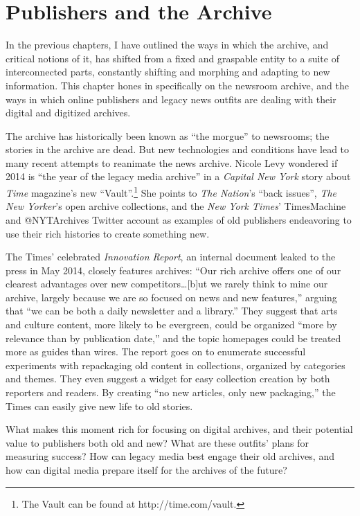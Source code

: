 \chapter{Publishers and the Archive}

In the previous chapters, I have outlined the ways in which the archive, and critical notions of it, has shifted from a fixed and graspable entity to a suite of interconnected parts, constantly shifting and morphing and adapting to new information. This chapter hones in specifically on the newsroom archive, and the ways in which online publishers and legacy news outfits are dealing with their digital and digitized archives.

The archive has historically been known as ``the morgue'' to newsrooms; the stories in the archive are dead. But new technologies and conditions have lead to many recent attempts to reanimate the news archive. Nicole Levy wondered if 2014 is ``the year of the legacy media archive'' in a \emph{Capital New York} story about \emph{Time} magazine's new ``Vault''.\footnote{The Vault can be found at http://time.com/vault.} She points to \emph{The Nation}'s ``back issues'', \emph{The New Yorker}'s open archive collections, and the \emph{New York Times}' TimesMachine and @NYTArchives Twitter account as examples of old publishers endeavoring to use their rich histories to create something new.\autocite{}

The Times' celebrated \emph{Innovation Report}, an internal document leaked to the press in May 2014, closely features archives: ``Our rich archive offers one of our clearest advantages over new competitors\ldots[b]ut we rarely think to mine our archive, largely because we are so focused on news and new features,'' arguing that ``we can be both a daily newsletter and a library.'' They suggest that arts and culture content, more likely to be evergreen, could be organized ``more by relevance than by publication date,'' and the topic homepages could be treated more as guides than wires. The report goes on to enumerate successful experiments with repackaging old content in collections, organized by categories and themes. They even suggest a widget for easy collection creation by both reporters and readers. By creating ``no new articles, only new packaging,'' the Times can easily give new life to old stories.

What makes this moment rich for focusing on digital archives, and their potential value to publishers both old and new? What are these outfits' plans for measuring success? How can legacy media best engage their old archives, and how can digital media prepare itself for the archives of the future?

